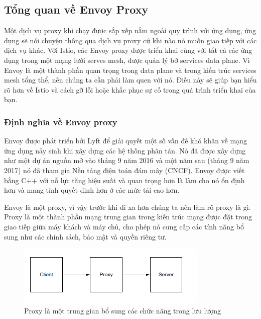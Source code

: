 \documentclass[12pt,a4paper]{report}
\begin{document}
		\subsection{Tổng quan về Envoy Proxy}
		\hspace{0.6cm}Một dịch vụ proxy khi chạy được sắp xếp nằm ngoài quy trình với ứng dụng, ứng dụng sẽ nói chuyện thông qua dịch vụ proxy cứ khi nào nó muốn giao tiếp với các dịch vụ khác. Với Istio, các Envoy proxy được triển khai cùng với tất cả các ứng dụng trong một mạng lưới serves mesh, được quản lý bở services data plane. Vì Envoy là một thành phần quan trọng trong data plane và trong kiến trúc services mesh tổng thể, nên chúng ta cần phải làm quen với nó. Điều này sẽ giúp bạn hiểu rõ hơn về Istio và cách gỡ lỗi hoặc khắc phục sự cố trong quá trình triển khai của bạn.
			\subsubsection{Định nghĩa về Envoy proxy}
		\hspace{0.6cm}Envoy được phát triển bởi Lyft để giải quyết một số vấn đề khó khăn về mạng ứng dụng nảy sinh khi xây dựng các hệ thống phân tán. Nó đã được xây dựng như một dự án nguồn mở vào tháng 9 năm 2016 và một năm sau (tháng 9 năm 2017) nó đã tham gia Nền tảng điện toán  đám mây (CNCF). Envoy được viết bằng C++ với nỗ lực tăng hiệu suất và quan trọng hơn là làm cho nó ổn định hơn và mang tính quyết định hơn ở các mức tải cao hơn.
		
		Envoy là một proxy, vì vậy trước khi đi xa hơn chúng ta nên làm rõ proxy là gì. Proxy là một thành phần mạng trung gian trong kiến trúc mạng được đặt trong giao tiếp giữa máy khách và máy chủ, cho phép nó cung cấp các tính năng bổ sung như các chính sách, bảo mật và quyền riêng tư.
		
		\begin{figure}[h]
			\centering
			\includegraphics[width=0.7\linewidth]{Pics/2.1.3-p1}
			\caption{Proxy là một trung gian bổ sung các chức năng trong lưu lượng}
			\label{fig:2.1.3-1}
		\end{figure}
		
\end{document}
